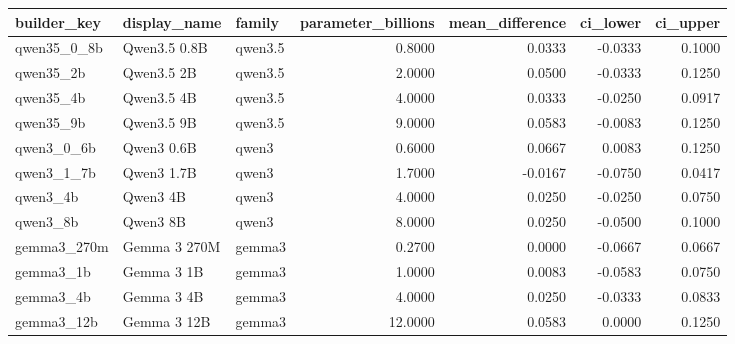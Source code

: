 \begin{tabular}{lllrrrr}
\toprule
builder_key & display_name & family & parameter_billions & mean_difference & ci_lower & ci_upper \\
\midrule
qwen35_0_8b & Qwen3.5 0.8B & qwen3.5 & 0.8000 & 0.0333 & -0.0333 & 0.1000 \\
qwen35_2b & Qwen3.5 2B & qwen3.5 & 2.0000 & 0.0500 & -0.0333 & 0.1250 \\
qwen35_4b & Qwen3.5 4B & qwen3.5 & 4.0000 & 0.0333 & -0.0250 & 0.0917 \\
qwen35_9b & Qwen3.5 9B & qwen3.5 & 9.0000 & 0.0583 & -0.0083 & 0.1250 \\
qwen3_0_6b & Qwen3 0.6B & qwen3 & 0.6000 & 0.0667 & 0.0083 & 0.1250 \\
qwen3_1_7b & Qwen3 1.7B & qwen3 & 1.7000 & -0.0167 & -0.0750 & 0.0417 \\
qwen3_4b & Qwen3 4B & qwen3 & 4.0000 & 0.0250 & -0.0250 & 0.0750 \\
qwen3_8b & Qwen3 8B & qwen3 & 8.0000 & 0.0250 & -0.0500 & 0.1000 \\
gemma3_270m & Gemma 3 270M & gemma3 & 0.2700 & 0.0000 & -0.0667 & 0.0667 \\
gemma3_1b & Gemma 3 1B & gemma3 & 1.0000 & 0.0083 & -0.0583 & 0.0750 \\
gemma3_4b & Gemma 3 4B & gemma3 & 4.0000 & 0.0250 & -0.0333 & 0.0833 \\
gemma3_12b & Gemma 3 12B & gemma3 & 12.0000 & 0.0583 & 0.0000 & 0.1250 \\
\bottomrule
\end{tabular}
